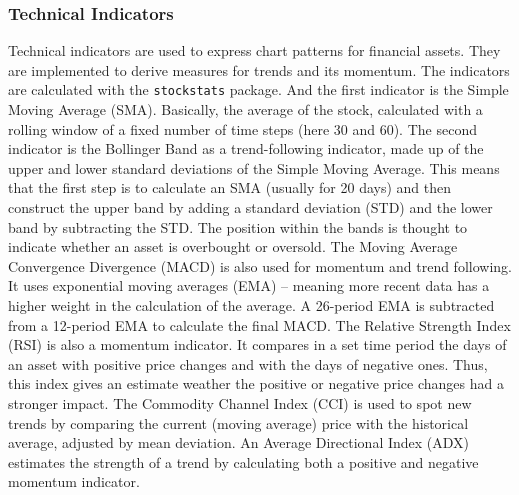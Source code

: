 \documentclass[12pt]{article}
\begin{document}
\subsubsection{Technical Indicators}%
Technical indicators are used to express chart patterns for financial assets. They are implemented to derive measures for trends and its momentum. The indicators are calculated with the \texttt{stockstats} \cite{Stockstats} package. And the first indicator is the Simple Moving Average (SMA). Basically, the average of the stock, calculated with a rolling window of a fixed number of time steps (here 30 and 60). \cite{Prado2018, Garita2021}
The second indicator is the Bollinger Band as a trend-following indicator, made up of the upper and lower standard deviations of the Simple Moving Average. This means that the first step is to calculate an SMA (usually for 20 days) and then construct the upper band by adding a standard deviation (STD) and the lower band by subtracting the STD. The position within the bands is thought to indicate whether an asset is overbought or oversold. \cite{Garita2021}
The Moving Average Convergence Divergence (MACD) is also used for momentum and trend following. It uses exponential moving averages (EMA) -- meaning  more recent data has a higher weight in the calculation of the average. A 26-period EMA is subtracted from a 12-period EMA to calculate the final MACD.
\cite{Garita2021}
The Relative Strength Index (RSI) is also a momentum indicator. It compares in a set time period the days of an asset   with positive price changes and with the days of negative ones. Thus, this index gives an estimate weather the positive or negative price changes had a stronger impact. \cite{Garita2021}
The Commodity Channel Index (CCI) is used to spot new trends by comparing the current (moving average) price with the historical average, adjusted by mean deviation. \cite{CCI}
An Average Directional Index (ADX) estimates the strength of a trend by calculating both a positive and negative momentum indicator. \cite{ADX}
\end{document}
